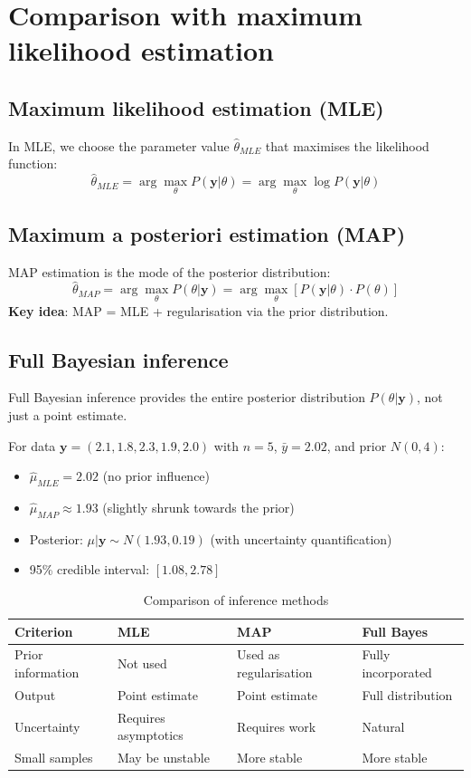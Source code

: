\section{Comparison with maximum likelihood estimation}
\subsection{Maximum likelihood estimation (MLE)}
In MLE, we choose the parameter value $\hat{\theta}_{MLE}$ that maximises the likelihood function:
$$\hat{\theta}_{MLE} = \arg\max_{\theta} P(\mathbf{y}|\theta) = \arg\max_{\theta} \log P(\mathbf{y}|\theta)$$
\subsection{Maximum a posteriori estimation (MAP)}
MAP estimation is the mode of the posterior distribution:
$$\hat{\theta}_{MAP} = \arg\max_{\theta} P(\theta|\mathbf{y}) = \arg\max_{\theta} [P(\mathbf{y}|\theta) \cdot P(\theta)]$$
\textbf{Key idea}: MAP = MLE + regularisation via the prior distribution.
\subsection{Full Bayesian inference}
Full Bayesian inference provides the entire posterior distribution $P(\theta|\mathbf{y})$, not just a point estimate.
\begin{examplebox}
\begin{example}
For data $\mathbf{y} = (2.1, 1.8, 2.3, 1.9, 2.0)$ with $n=5$, $\bar{y} = 2.02$, and prior $N(0, 4)$:
\begin{itemize}
\item $\hat{\mu}_{MLE} = 2.02$ (no prior influence)
\item $\hat{\mu}_{MAP} \approx 1.93$ (slightly shrunk towards the prior)
\item Posterior: $\mu|\mathbf{y} \sim N(1.93, 0.19)$ (with uncertainty quantification)
\item 95\% credible interval: $[1.08, 2.78]$
\end{itemize}
\end{example}
\end{examplebox}
\begin{table}[h]
\centering
\caption{Comparison of inference methods}
\begin{tabular}{lp{3cm}p{3cm}p{3cm}}
\toprule
\textbf{Criterion} & \textbf{MLE} & \textbf{MAP} & \textbf{Full Bayes} \\
\midrule
Prior information & Not used & Used as regularisation & Fully incorporated \\
Output & Point estimate & Point estimate & Full distribution \\
Uncertainty & Requires asymptotics & Requires work & Natural \\
Small samples & May be unstable & More stable & More stable \\
\bottomrule
\end{tabular}
\end{table}

